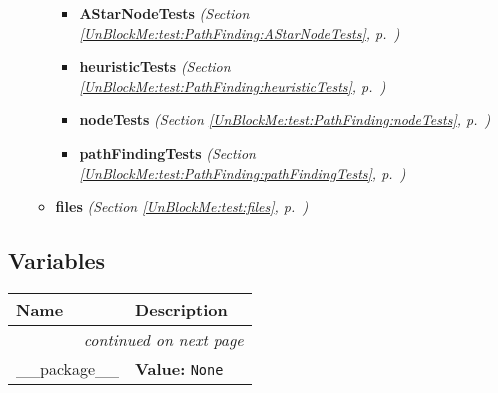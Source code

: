 \begin{itemize}
\begin{itemize}
      \begin{itemize}
    \setlength{\parskip}{0ex}
        \item \textbf{AStarNodeTests}
  \textit{(Section \ref{UnBlockMe:test:PathFinding:AStarNodeTests}, p.~\pageref{UnBlockMe:test:PathFinding:AStarNodeTests})}

        \item \textbf{heuristicTests}
  \textit{(Section \ref{UnBlockMe:test:PathFinding:heuristicTests}, p.~\pageref{UnBlockMe:test:PathFinding:heuristicTests})}

        \item \textbf{nodeTests}
  \textit{(Section \ref{UnBlockMe:test:PathFinding:nodeTests}, p.~\pageref{UnBlockMe:test:PathFinding:nodeTests})}

        \item \textbf{pathFindingTests}
  \textit{(Section \ref{UnBlockMe:test:PathFinding:pathFindingTests}, p.~\pageref{UnBlockMe:test:PathFinding:pathFindingTests})}

      \end{itemize}
    \item \textbf{files}
  \textit{(Section \ref{UnBlockMe:test:files}, p.~\pageref{UnBlockMe:test:files})}

  \end{itemize}
\end{itemize}



  \subsection{Variables}

    \vspace{-1cm}
\hspace{\varindent}\begin{longtable}{|p{\varnamewidth}|p{\vardescrwidth}|l}
\cline{1-2}
\cline{1-2} \centering \textbf{Name} & \centering \textbf{Description}& \\
\cline{1-2}
\endhead\cline{1-2}\multicolumn{3}{r}{\small\textit{continued on next page}}\\\endfoot\cline{1-2}
\endlastfoot\raggedright \_\-\_\-p\-a\-c\-k\-a\-g\-e\-\_\-\_\- & \raggedright \textbf{Value:} 
{\tt None}&\\
\cline{1-2}
\end{longtable}

